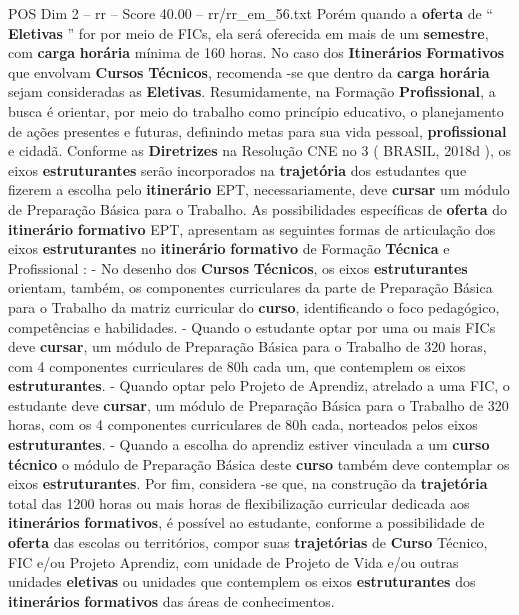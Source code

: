 \begin{textsample}{POS Dim 2 – rr – Score 40.00 – rr/rr\_em\_56.txt}
Porém quando a \textbf{oferta} de “ \textbf{Eletivas} ” for por meio de FICs, ela será oferecida em mais de um \textbf{semestre}, com \textbf{carga} \textbf{horária} mínima de 160 horas.
No caso dos \textbf{Itinerários} \textbf{Formativos} que envolvam \textbf{Cursos} \textbf{Técnicos}, recomenda -se que dentro da \textbf{carga} \textbf{horária} sejam consideradas as \textbf{Eletivas}.
Resumidamente, na Formação \textbf{Profissional}, a busca é orientar, por meio do trabalho como princípio educativo, o planejamento de ações presentes e futuras, definindo metas para sua vida pessoal, \textbf{profissional} e cidadã.
Conforme as \textbf{Diretrizes} na Resolução CNE no 3 ( BRASIL, 2018d ), os eixos \textbf{estruturantes} serão incorporados na \textbf{trajetória} dos estudantes que fizerem a escolha pelo \textbf{itinerário} EPT, necessariamente, deve \textbf{cursar} um módulo de Preparação Básica para o Trabalho.
As possibilidades específicas de \textbf{oferta} do \textbf{itinerário} \textbf{formativo} EPT, apresentam as seguintes formas de articulação dos eixos \textbf{estruturantes} no \textbf{itinerário} \textbf{formativo} de Formação \textbf{Técnica} e Profissional : - No desenho dos \textbf{Cursos} \textbf{Técnicos}, os eixos \textbf{estruturantes} orientam, também, os componentes curriculares da parte de Preparação Básica para o Trabalho da matriz curricular do \textbf{curso}, identificando o foco pedagógico, competências e habilidades. - Quando o estudante optar por uma ou mais FICs deve \textbf{cursar}, um módulo de Preparação Básica para o Trabalho de 320 horas, com 4 componentes curriculares de 80h cada um, que contemplem os eixos \textbf{estruturantes}. - Quando optar pelo Projeto de Aprendiz, atrelado a uma FIC, o estudante deve \textbf{cursar}, um módulo de Preparação Básica para o Trabalho de 320 horas, com os 4 componentes curriculares de 80h cada, norteados pelos eixos \textbf{estruturantes}. - Quando a escolha do aprendiz estiver vinculada a um \textbf{curso} \textbf{técnico} o módulo de Preparação Básica deste \textbf{curso} também deve contemplar os eixos \textbf{estruturantes}.
Por fim, considera -se que, na construção da \textbf{trajetória} total das 1200 horas ou mais horas de flexibilização curricular dedicada aos \textbf{itinerários} \textbf{formativos}, é possível ao estudante, conforme a possibilidade de \textbf{oferta} das escolas ou territórios, compor suas \textbf{trajetórias} de \textbf{Curso} Técnico, FIC e/ou Projeto Aprendiz, com unidade de Projeto de Vida e/ou outras unidades \textbf{eletivas} ou unidades que contemplem os eixos \textbf{estruturantes} dos \textbf{itinerários} \textbf{formativos} das áreas de conhecimentos.

\end{textsample}
